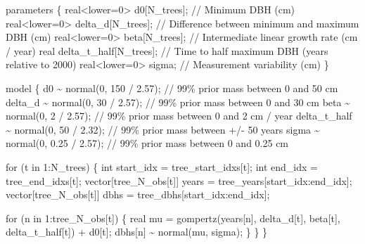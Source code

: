 \documentclass[
  letterpaper,
  DIV=11,
  numbers=noendperiod]{scrartcl}
\newenvironment{Shaded}{\begin{snugshade}}{\end{snugshade}}
\newcommand{\CommentTok}[1]{\textcolor[rgb]{0.37,0.37,0.37}{#1}}
\newcommand{\ControlFlowTok}[1]{\textcolor[rgb]{0.00,0.23,0.31}{#1}}
\newcommand{\DataTypeTok}[1]{\textcolor[rgb]{0.68,0.00,0.00}{#1}}
\newcommand{\DecValTok}[1]{\textcolor[rgb]{0.68,0.00,0.00}{#1}}
\newcommand{\FloatTok}[1]{\textcolor[rgb]{0.68,0.00,0.00}{#1}}
\newcommand{\KeywordTok}[1]{\textcolor[rgb]{0.00,0.23,0.31}{#1}}
\newcommand{\NormalTok}[1]{\textcolor[rgb]{0.00,0.23,0.31}{#1}}
\begin{document}
\begin{codelisting}
\begin{Shaded}
\begin{Highlighting}[]
\KeywordTok{parameters}\NormalTok{ \{}
  \DataTypeTok{real}\NormalTok{\textless{}}\KeywordTok{lower}\NormalTok{=}\DecValTok{0}\NormalTok{\textgreater{} d0[N\_trees];      }\CommentTok{// Minimum DBH (cm)}
  \DataTypeTok{real}\NormalTok{\textless{}}\KeywordTok{lower}\NormalTok{=}\DecValTok{0}\NormalTok{\textgreater{} delta\_d[N\_trees]; }\CommentTok{// Difference between minimum and maximum DBH (cm)}
  \DataTypeTok{real}\NormalTok{\textless{}}\KeywordTok{lower}\NormalTok{=}\DecValTok{0}\NormalTok{\textgreater{} beta[N\_trees];    }\CommentTok{// Intermediate linear growth rate (cm / year)}
  \DataTypeTok{real}\NormalTok{ delta\_t\_half[N\_trees];     }\CommentTok{// Time to half maximum DBH (years relative to 2000)}
  \DataTypeTok{real}\NormalTok{\textless{}}\KeywordTok{lower}\NormalTok{=}\DecValTok{0}\NormalTok{\textgreater{} sigma;            }\CommentTok{// Measurement variability (cm)}
\NormalTok{\}}

\KeywordTok{model}\NormalTok{ \{}
\NormalTok{  d0 \textasciitilde{} normal(}\DecValTok{0}\NormalTok{, }\DecValTok{150}\NormalTok{ / }\FloatTok{2.57}\NormalTok{);          }\CommentTok{// 99\% prior mass between 0 and 50 cm}
\NormalTok{  delta\_d \textasciitilde{} normal(}\DecValTok{0}\NormalTok{, }\DecValTok{30}\NormalTok{ / }\FloatTok{2.57}\NormalTok{);      }\CommentTok{// 99\% prior mass between 0 and 30 cm}
\NormalTok{  beta \textasciitilde{} normal(}\DecValTok{0}\NormalTok{, }\DecValTok{2}\NormalTok{ / }\FloatTok{2.57}\NormalTok{);          }\CommentTok{// 99\% prior mass between 0 and 2 cm / year}
\NormalTok{  delta\_t\_half \textasciitilde{} normal(}\DecValTok{0}\NormalTok{, }\DecValTok{50}\NormalTok{ / }\FloatTok{2.32}\NormalTok{); }\CommentTok{// 99\% prior mass between +/{-} 50 years}
\NormalTok{  sigma \textasciitilde{} normal(}\DecValTok{0}\NormalTok{, }\FloatTok{0.25}\NormalTok{ / }\FloatTok{2.57}\NormalTok{);      }\CommentTok{// 99\% prior mass between 0 and 0.25 cm }
  
  \ControlFlowTok{for}\NormalTok{ (t }\ControlFlowTok{in} \DecValTok{1}\NormalTok{:N\_trees) \{}
    \DataTypeTok{int}\NormalTok{ start\_idx = tree\_start\_idxs[t];}
    \DataTypeTok{int}\NormalTok{ end\_idx = tree\_end\_idxs[t];}
    \DataTypeTok{vector}\NormalTok{[tree\_N\_obs[t]] years = tree\_years[start\_idx:end\_idx];}
    \DataTypeTok{vector}\NormalTok{[tree\_N\_obs[t]] dbhs = tree\_dbhs[start\_idx:end\_idx];}
    
    \ControlFlowTok{for}\NormalTok{ (n }\ControlFlowTok{in} \DecValTok{1}\NormalTok{:tree\_N\_obs[t]) \{}
      \DataTypeTok{real}\NormalTok{ mu =  gompertz(years[n], delta\_d[t], beta[t], delta\_t\_half[t]) }
\NormalTok{               + d0[t];}
\NormalTok{      dbhs[n] \textasciitilde{} normal(mu, sigma);}
\NormalTok{    \}}
\NormalTok{  \}}
\NormalTok{\}}


\end{Highlighting}
\end{Shaded}
\end{codelisting}
\end{document}
